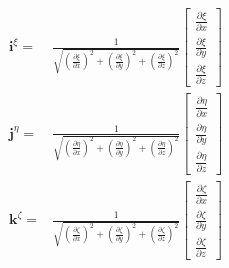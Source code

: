 \documentclass
[
a4paper,                      %
twoside,					  %
12pt,                         %
abstract,		      %
fleqn,                        %
]
{scrartcl} %
\begin{document}
\begin{description}
\begin{equation}
\begin{aligned}
\mathbf{i}^{\xi}=&\frac{1}{\sqrt{\left(\frac{\partial\xi}{\partial x}\right)^{2}+\left(\frac{\partial\xi}{\partial y}\right)^{2}+\left(\frac{\partial\xi}{\partial z}\right)^{2}}}\begin{bmatrix}
\frac{\partial\xi}{\partial x}\\[5pt]
\frac{\partial\xi}{\partial y}\\[5pt]
\frac{\partial\xi}{\partial z}\end{bmatrix}\\
\mathbf{j}^{\eta}=&\frac{1}{\sqrt{\left(\frac{\partial\eta}{\partial x}\right)^{2}+\left(\frac{\partial\eta}{\partial y}\right)^{2}+\left(\frac{\partial\eta}{\partial z}\right)^{2}}}\begin{bmatrix}
\frac{\partial\eta}{\partial x}\\[5pt]
\frac{\partial\eta}{\partial y}\\[5pt]
\frac{\partial\eta}{\partial z}\end{bmatrix}\\
\mathbf{k}^{\zeta}=&\frac{1}{\sqrt{\left(\frac{\partial\zeta}{\partial x}\right)^{2}+\left(\frac{\partial\zeta}{\partial y}\right)^{2}+\left(\frac{\partial\zeta}{\partial z}\right)^{2}}}\begin{bmatrix}
\frac{\partial\zeta}{\partial x}\\[5pt]
\frac{\partial\zeta}{\partial y}\\[5pt]
\frac{\partial\zeta}{\partial z}
\end{bmatrix}
\end{aligned}
\end{equation}


\end{description}
\end{document}

